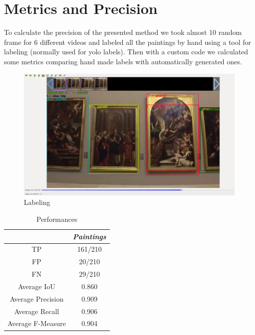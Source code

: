 \documentclass[conference]{IEEEtran}
\begin{document}
\section{Metrics and Precision}
To calculate the precision of the presented method we took almost 10 random frame for 6 different videos and labeled all the paintings by hand using a tool for labeling (normally used for yolo labels). Then with a custom code we calculated some metrics comparing hand made labels with automatically generated ones.

\begin{figure}[htbp]
\centerline{\includegraphics[width=0.8\columnwidth]{../Labeling_precision_metrics/Precision_Labeling.png}}
\caption{Labeling}
\label{fig_labeling}
\end{figure}
\bigskip

\begin{table}[htbp]
\caption{Performances}
\begin{center}
\begin{tabular}{|c|c|}
\hline
\textbf{} & \textbf{\textit{Paintings}} \\
\hline
TP& 161/210\\
\hline
FP& 20/210\\
\hline
FN& 29/210\\
\hline
Average IoU& 0.860\\
\hline
Average Precision& 0.909\\
\hline
Average Recall& 0.906\\
\hline
Average F-Measure& 0.904\\
\hline
\end{tabular}
\label{tab1}
\end{center}
\end{table}
\end{document}
